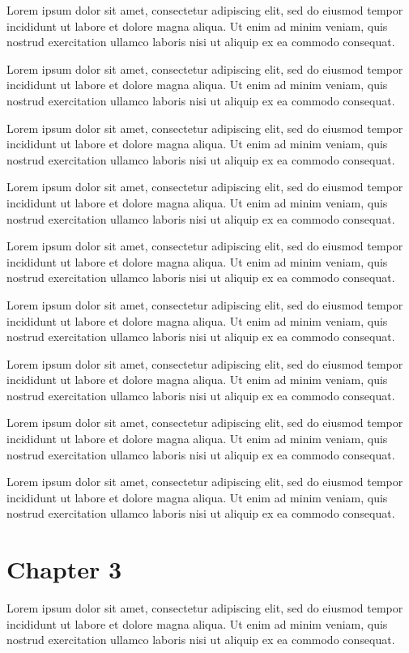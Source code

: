 \documentclass{book}
\begin{document}
Lorem ipsum dolor sit amet, consectetur adipiscing elit, sed do eiusmod tempor incididunt ut labore et dolore magna aliqua. Ut enim ad minim veniam, quis nostrud exercitation ullamco laboris nisi ut aliquip ex ea commodo consequat.

Lorem ipsum dolor sit amet, consectetur adipiscing elit, sed do eiusmod tempor incididunt ut labore et dolore magna aliqua. Ut enim ad minim veniam, quis nostrud exercitation ullamco laboris nisi ut aliquip ex ea commodo consequat.

Lorem ipsum dolor sit amet, consectetur adipiscing elit, sed do eiusmod tempor incididunt ut labore et dolore magna aliqua. Ut enim ad minim veniam, quis nostrud exercitation ullamco laboris nisi ut aliquip ex ea commodo consequat.

Lorem ipsum dolor sit amet, consectetur adipiscing elit, sed do eiusmod tempor incididunt ut labore et dolore magna aliqua. Ut enim ad minim veniam, quis nostrud exercitation ullamco laboris nisi ut aliquip ex ea commodo consequat.

Lorem ipsum dolor sit amet, consectetur adipiscing elit, sed do eiusmod tempor incididunt ut labore et dolore magna aliqua. Ut enim ad minim veniam, quis nostrud exercitation ullamco laboris nisi ut aliquip ex ea commodo consequat.

Lorem ipsum dolor sit amet, consectetur adipiscing elit, sed do eiusmod tempor incididunt ut labore et dolore magna aliqua. Ut enim ad minim veniam, quis nostrud exercitation ullamco laboris nisi ut aliquip ex ea commodo consequat.

Lorem ipsum dolor sit amet, consectetur adipiscing elit, sed do eiusmod tempor incididunt ut labore et dolore magna aliqua. Ut enim ad minim veniam, quis nostrud exercitation ullamco laboris nisi ut aliquip ex ea commodo consequat.

Lorem ipsum dolor sit amet, consectetur adipiscing elit, sed do eiusmod tempor incididunt ut labore et dolore magna aliqua. Ut enim ad minim veniam, quis nostrud exercitation ullamco laboris nisi ut aliquip ex ea commodo consequat.

Lorem ipsum dolor sit amet, consectetur adipiscing elit, sed do eiusmod tempor incididunt ut labore et dolore magna aliqua. Ut enim ad minim veniam, quis nostrud exercitation ullamco laboris nisi ut aliquip ex ea commodo consequat.

\chapter{Chapter 3}
Lorem ipsum dolor sit amet, consectetur adipiscing elit, sed do eiusmod tempor incididunt ut labore et dolore magna aliqua. Ut enim ad minim veniam, quis nostrud exercitation ullamco laboris nisi ut aliquip ex ea commodo consequat.
\end{document}
